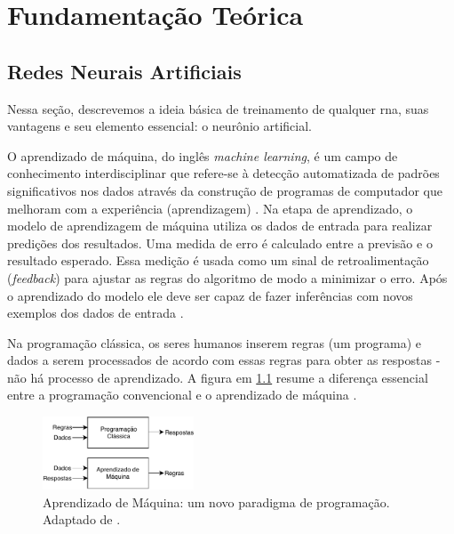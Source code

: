 \chapter{Fundamentação Teórica}


\section{Redes Neurais Artificiais}
Nessa seção, descrevemos a ideia básica de treinamento de qualquer \gls{rna}, suas vantagens e seu elemento essencial: o neurônio artificial. 


O aprendizado de máquina, do inglês \textit{machine learning}, é um campo de conhecimento interdisciplinar que refere-se à detecção automatizada de padrões significativos nos dados através da construção de programas de computador que melhoram com a experiência (aprendizagem) \cite{shalev2014understanding}. 
Na etapa de aprendizado, o modelo de aprendizagem de máquina  utiliza os dados de entrada para realizar predições dos resultados. Uma medida de erro é calculado entre a previsão e o resultado esperado. Essa medição é usada como um sinal de retroalimentação (\textit{feedback}) para ajustar as regras  do algoritmo de modo a minimizar o erro. Após o aprendizado do modelo ele deve ser capaz de fazer inferências com novos exemplos dos dados de entrada \cite{FrancoisDeepLearning}.

Na programação clássica, os seres humanos inserem regras (um programa) e dados a serem processados de acordo com essas regras para obter as respostas  -  não há processo de aprendizado. A figura em \ref{fig:machinelearning} resume a diferença essencial entre a programação convencional e o aprendizado de máquina \cite{FrancoisDeepLearning}.  


\begin{figure}[h]
	\centering
	\includegraphics[width=0.4\textwidth]{figuras/MachineLearning.pdf}
	\caption[Paradigmas de programação]{Aprendizado de Máquina: um novo paradigma de programação. Adaptado de \cite{FrancoisDeepLearning}.}
	\label{fig:machinelearning}
\end{figure}



